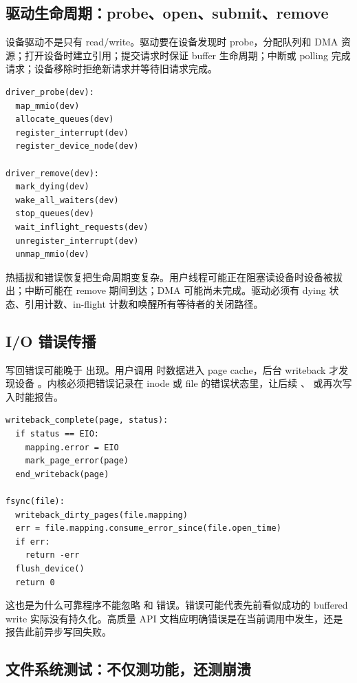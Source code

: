 \subsection{驱动生命周期：probe、open、submit、remove}

设备驱动不是只有 read/write。驱动要在设备发现时 probe，分配队列和 DMA 资源；打开设备时建立引用；提交请求时保证 buffer 生命周期；中断或 polling 完成请求；设备移除时拒绝新请求并等待旧请求完成。

\begin{lstlisting}
driver_probe(dev):
  map_mmio(dev)
  allocate_queues(dev)
  register_interrupt(dev)
  register_device_node(dev)

driver_remove(dev):
  mark_dying(dev)
  wake_all_waiters(dev)
  stop_queues(dev)
  wait_inflight_requests(dev)
  unregister_interrupt(dev)
  unmap_mmio(dev)
\end{lstlisting}

热插拔和错误恢复把生命周期变复杂。用户线程可能正在阻塞读设备时设备被拔出；中断可能在 remove 期间到达；DMA 可能尚未完成。驱动必须有 dying 状态、引用计数、in-flight 计数和唤醒所有等待者的关闭路径。

\subsection{I/O 错误传播}

写回错误可能晚于  出现。用户调用  时数据进入 page cache，后台 writeback 才发现设备 。内核必须把错误记录在 inode 或 file 的错误状态里，让后续 、 或再次写入时能报告。

\begin{lstlisting}
writeback_complete(page, status):
  if status == EIO:
    mapping.error = EIO
    mark_page_error(page)
  end_writeback(page)

fsync(file):
  writeback_dirty_pages(file.mapping)
  err = file.mapping.consume_error_since(file.open_time)
  if err:
    return -err
  flush_device()
  return 0
\end{lstlisting}

这也是为什么可靠程序不能忽略  和  错误。错误可能代表先前看似成功的 buffered write 实际没有持久化。高质量 API 文档应明确错误是在当前调用中发生，还是报告此前异步写回失败。

\subsection{文件系统测试：不仅测功能，还测崩溃}

